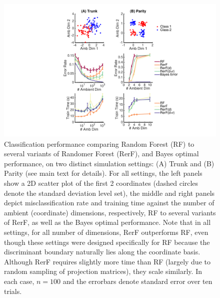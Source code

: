 \documentclass{article} %
\begin{document}


\begin{figure}[h]
\begin{center}
\includegraphics[trim=0in 0in 0in 0in, clip=true, width=\linewidth]{../Figures/pdf/Fig1_Simulation}
\end{center}
\caption{Classification performance comparing Random Forest (RF) to several variants of Randomer Forest (RerF), and Bayes optimal performance, on two distinct simulation settings: (A) Trunk and (B) Parity (see main text for details).  For all settings, the left panels show a 2D scatter plot of the first 2 coordinates (dashed circles denote the standard deviation level set), the middle and right panels depict misclassification rate and training time against the number of ambient (coordinate) dimensions, respectively, RF to several variants of RerF, as well as the Bayes optimal performance.  Note that in all settings, for all number of dimensions, RerF outperforms RF, even though these settings were designed specifically for RF because the discriminant boundary naturally lies along the coordinate basis. Although RerF requires slightly more time than RF (largely due to random sampling of projection matrices), they scale similarly. In each case, $n=100$ and the errorbars denote standard error over ten trials.}
\label{fig:sim}
\end{figure}
\end{document}
